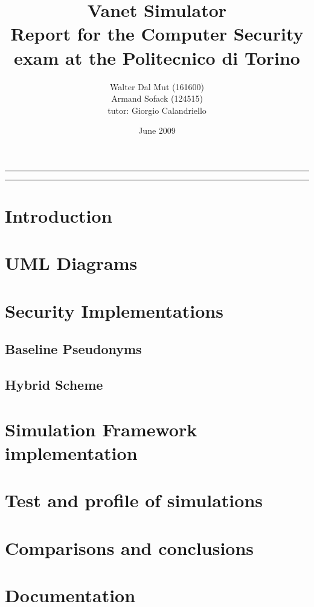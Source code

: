 \documentclass[a4paper,12pt]{article}
\def\baseline{Baseline Pseudonyms}
\def\hybrid{Hybrid Scheme}
\begin{document}
\title{Vanet Simulator
\\
{\normalsize Report for the Computer Security exam at the Politecnico di Torino}
}
\author{Walter Dal Mut (161600)\\Armand Sofack (124515)
\\
{\normalsize tutor: Giorgio Calandriello}
}
\date{June 2009}
\maketitle

\vfill

\rule{\textwidth}{1pt}

\tableofcontents

\rule{\textwidth}{1pt}

\vfill

\newpage
\section{Introduction}
\section{UML Diagrams}
\section{Security Implementations}
\subsection{\baseline}

\subsection{\hybrid}
\section{Simulation Framework implementation}

\section{Test and profile of simulations}
\section{Comparisons and conclusions}
\section{Documentation}
\end{document}
